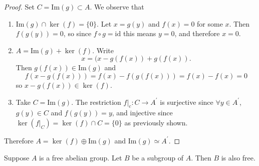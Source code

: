 \begin{proof}
Set $C = \mathrm{Im}(g) \subset A$. We observe that
\begin{enumerate}
  \item{$\mathrm{Im}(g) \cap \ker(f) = \{ 0 \}$.
        Let $x = g(y)$ and $f(x) = 0$ for some $x$. Then
        $f(g(y)) = 0$, so since $f \circ g = \mathrm{id}$ this means
        $y = 0$, and therefore $x = 0$.
       }
  \item{$A = \mathrm{Im}(g) + \ker(f)$. Write
        $$
        x = (x - g(f(x)) + g(f(x)).
        $$
        Then $g(f(x)) \in \mathrm{Im}(g)$ and
        $$
        f(x - g(f(x))) = f(x) - f(g(f(x))) = f(x) - f(x) = 0
        $$
        so $x - g(f(x)) \in \ker(f)$.
       }
  \item{Take $C = \mathrm{Im}(g)$. The restriction $f|_c : C \to
        A^\prime$ is surjective since $\forall y \in A^\prime$,
        $g(y) \in C$ and $f(g(y)) = y$, and injective since
        $\ker (f|_C) = \ker(f) \cap C = \{ 0 \}$ as previously shown.
       }
\end{enumerate}
Therefore $A = \ker(f) \oplus \mathrm{Im}(g)$ and $\mathrm{Im}(g)
\simeq A^\prime$.
\end{proof}

\begin{theorem}
Suppose $A$ is a free abelian group. Let $B$ be a subgroup of $A$.
Then $B$ is also free.
\end{theorem}

